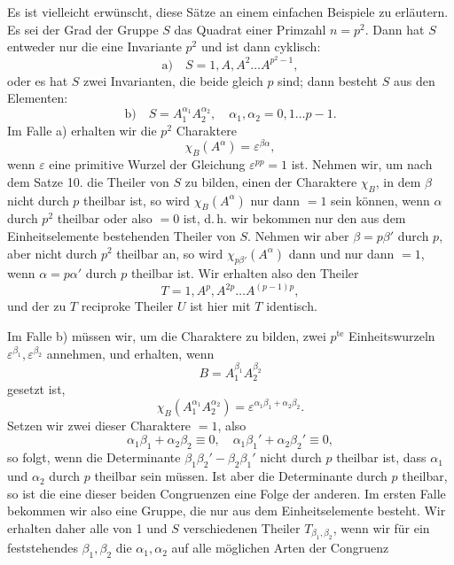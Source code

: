 
Es ist vielleicht erwünscht, diese Sätze an einem einfachen
Beispiele zu erläutern. Es sei der Grad der Gruppe $S$ das Quadrat
einer Primzahl $n = p^2$. Dann hat $S$ entweder nur die eine
Invariante $p^2$ und ist dann cyklisch:
\[
\text{a)}\quad S = 1, A, A^2 \dots A^{p^2-1},
\]
oder es hat $S$ zwei Invarianten, die beide gleich $p$ sind; dann
besteht $S$ aus den Elementen:
\[
\text{b)}\quad S = A_1^{\alpha_1}A_2^{\alpha_2}, \quad \alpha_1,
\alpha_2 = 0, 1 \dots p-1.
\]
Im Falle a) erhalten wir die $p^2$ Charaktere
\[
\chi_B(A^\alpha) = \varepsilon^{\beta\alpha},
\]
wenn $\varepsilon$ eine primitive Wurzel der Gleichung
$\varepsilon^{pp} = 1$ ist.
Nehmen wir, um nach dem Satze 10. die
Theiler von $S$ zu bilden, einen der Charaktere $\chi_B$, in dem
$\beta$ nicht durch $p$ theilbar ist, so wird $\chi_B(A^\alpha)$
nur dann $= 1$ sein können, wenn $\alpha$ durch $p^2$ theilbar
oder also $= 0$ ist, d.\,h. wir bekommen nur den aus dem
Einheitselemente bestehenden Theiler von $S$. Nehmen wir aber
$\beta = p\beta'$ durch $p$, aber nicht durch $p^2$ theilbar an, so
wird $\chi_{p\beta'}(A^\alpha)$ dann und nur dann $= 1$, wenn
$\alpha = p\alpha'$ durch $p$ theilbar ist. Wir erhalten also den
Theiler
\[
T = 1, A^p, A^{2p} \dots A^{(p-1)p},
\]
und der zu $T$ reciproke Theiler $U$ ist hier mit $T$ identisch.

Im Falle b) müssen wir, um die Charaktere zu bilden, zwei
$p^{\text{te}}$ Einheitswurzeln $\varepsilon^{\beta_1},
\varepsilon^{\beta_2}$ annehmen, und erhalten, wenn
\[
B = A_1^{\beta_1}A_2^{\beta_2}
\]
gesetzt ist,
\[
\chi_B(A_1^{\alpha_1}A_2^{\alpha_2}) = \varepsilon^{\alpha_1\beta_1 + \alpha_2\beta_2}.
\]
Setzen wir zwei dieser Charaktere $= 1$, also
\[
\alpha_1\beta_1 + \alpha_2\beta_2 \equiv 0, \quad
\alpha_1\beta_1' + \alpha_2\beta_2' \equiv 0,
\]
so folgt, wenn die Determinante $\beta_1\beta_2' - \beta_2\beta_1'$
nicht durch $p$ theilbar ist, dass $\alpha_1$ und $\alpha_2$ durch
$p$ theilbar sein müssen. Ist aber die Determinante durch $p$
theilbar, so ist die eine dieser beiden Congruenzen eine Folge der
anderen. Im ersten Falle bekommen wir also eine Gruppe, die nur
aus dem Einheitselemente besteht. Wir erhalten daher alle von 1
und $S$ verschiedenen Theiler $T_{\beta_1,\beta_2}$, wenn wir für
ein feststehendes $\beta_1, \beta_2$ die $\alpha_1, \alpha_2$ auf
alle möglichen Arten der Congruenz
